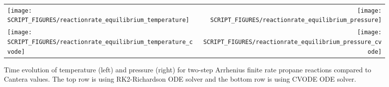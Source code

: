 \documentclass[11pt]{book}
\begin{document}
\begin{figure}[ht]
\begin{tabular*}{\textwidth}{lr}
\texttt{[image: SCRIPT\_FIGURES/reactionrate\_equilibrium\_temperature]} &
\texttt{[image: SCRIPT\_FIGURES/reactionrate\_equilibrium\_pressure]} \\
\texttt{[image: SCRIPT\_FIGURES/reactionrate\_equilibrium\_temperature\_cvode]} &
\texttt{[image: SCRIPT\_FIGURES/reactionrate\_equilibrium\_pressure\_cvode]}
\end{tabular*}
\caption[Temperature and pressure evolution for equilibrium case]{Time evolution of temperature (left) and pressure (right) for two-step Arrhenius finite rate propane reactions compared to Cantera values. The top row is using RK2-Richardson ODE solver and the bottom row is using CVODE ODE solver.}
\label{fig:Arrhenius_175Order_23stepb}
\end{figure}
\end{document}
